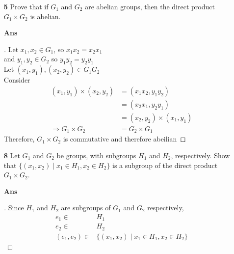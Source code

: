 \documentclass[paper=usletter, fontsize=12pt]{article}
\begin{document}
\begin{itemize}
\begin{itemize}
            \item[\textbf{5}] Prove that if $G_1$ and $G_2$ are abelian groups,
            then the direct product $G_1 \times G_2$ is abelian.
            \item[\textbf{Ans}]
            \begin{proof}[\unskip\nopunct]

                Let $x_1,x_2 \in G_1$, so $x_1x_2=x_2x_1$\\
                and $y_1,y_2 \in G_2$ so $y_1y_2=y_2y_1$\\
                Let $(x_1,y_1),(x_2,y_2) \in G_1G_2$\\
                Consider
                \begin{align*}
                    (x_1,y_1)\times(x_2,y_2) & = (x_1x_2, y_1y_2)\\
                    & = (x_2x_1 ,y_2y_1)\\
                    & = (x_2,y_2)\times(x_1,y_1)\\
                    \Rightarrow G_1 \times G_2 & = G_2 \times G_1
                \end{align*}
                Therefore, $G_1\times G_2$ is commutative and therefore abeilian \qedhere

            \end{proof}
            \vspace{0.2in}

            \item[\textbf{8}] Let $G_1$ and $G_2$ be groups, with subgroups
            $H_1$ and $H_2$, respectively. Show that $\{(x_1,x_2) \mid x_1 \in
            H_1, x_2 \in H_2\}$ is a subgroup of the direct product $G_1 \times
            G_2$.
            \item[\textbf{Ans}]
            \begin{proof}[\unskip\nopunct]

                Since $H_1$ and $H_2$ are subgroups of $G_1$ and $G_2$ respectively,
                \begin{align*}
                    e_1 \in & H_1\\
                    e_2 \in & H_2\\
                    (e_1,e_2) \in & \{(x_1,x_2) \mid x_1 \in H_1, x_2 \in H_2\}
                \end{align*}


\end{proof}
\end{itemize}
\end{itemize}
\end{document}

